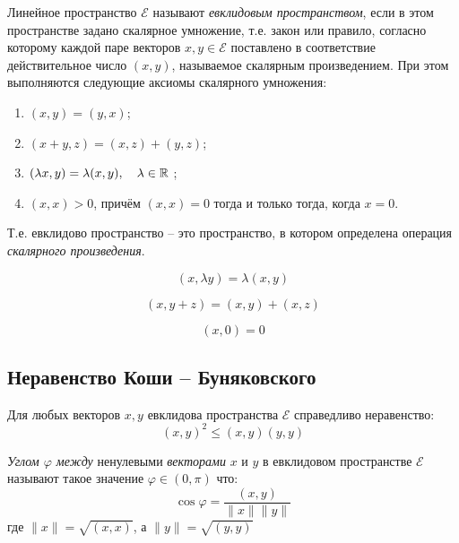 \begin{definition}
  Линейное пространство $\mathcal{E}$ называют \textit{евклидовым пространством}, если в этом пространстве задано скалярное умножение, т.е. закон или правило, согласно которому каждой паре векторов $x, y \in \mathcal{E}$ поставлено в соответствие действительное число $(x, y)$, называемое скалярным произведением. При этом выполняются следующие аксиомы скалярного умножения:
  \begin{enumerate}
    \item $(x, y) = (y, x)$;
    \item $(x + y, z) = (x, z) + (y, z)$;
    \item  $(\lambda x, y) = \lambda (x, y), \quad \lambda \in \mathbb{R}$ ;
    \item $(x, x) > 0$, причём $\left( x, x \right) = 0$ тогда и только тогда, когда $x = 0$.
  \end{enumerate}
\end{definition}

\begin{note}
  Т.е. евклидово пространство -- это пространство, в котором определена операция \textit{скалярного произведения}. 
\end{note}

\begin{property}[1]
   \[ (x, \lambda y) = \lambda (x, y) \] 
\end{property}

\begin{property}[2]
   \[ (x, y + z) = (x, y) + (x, z) \] 
\end{property}

\begin{property}[3]
  \[ (x, 0) = 0 \] 
\end{property}

\subsection{Неравенство Коши -- Буняковского}

\begin{theorem}
  Для любых векторов $x, y$ евклидова пространства $\mathcal{E}$ справедливо неравенство:  \[
    \left( x, y \right)^2 \le (x, y)(y, y)
  \] 
\end{theorem}

\begin{definition}
  \textit{Углом $\varphi$ между} ненулевыми \textit{векторами} $x$ и $y$ в евклидовом пространстве $\mathcal{E}$ называют такое значение  $\varphi \in (0, \pi)$ что: \[
    \cos \varphi = \frac{(x, y)}{\|x\| \|y\|}
  \] 
  где $\|x\| = \sqrt{(x, x)}$, а $\|y\| = \sqrt{(y, y)}$
\end{definition}

